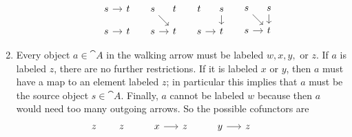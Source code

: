 \documentclass[Book-Poly]{subfiles}
\begin{document}
\begin{exercise}
\begin{solution}
\begin{enumerate}
\[	\quad\;
    \begin{tikzcd}[sep=10pt]
        s\ar[r]&t\\
        s\ar[r]&t
    \end{tikzcd}
	\quad\;
    \begin{tikzcd}[sep=10pt]
        s\ar[dr]&t\\
	s\ar[r]&t
    \end{tikzcd}
        \quad\;
    \begin{tikzcd}[sep=10pt]
        t&s\ar[d]\\
        s\ar[r]&t
    \end{tikzcd}
        \quad\;
    \begin{tikzcd}[sep=10pt]
        s\ar[dr]&s\ar[d]\\
        s\ar[r]&t
    \end{tikzcd}
\]
    \item Every object $a\in\cat{A}$ in the walking arrow must be labeled $w,x,y,$ or $z$.
    If $a$ is labeled $z$, there are no further restrictions.
    If it is labeled $x$ or $y$, then $a$ must have a map to an element labeled $z$; in particular this implies that $a$ must be the source object $s\in\cat{A}$.
    Finally, $a$ cannot be labeled $w$ because then $a$ would need too many outgoing arrows.
    So the possible cofunctors are
\[
    \begin{tikzcd}[sep=15pt]
        z&z
    \end{tikzcd}
	\qquad\;
    \begin{tikzcd}[sep=15pt]
        x\ar[r]&z
    \end{tikzcd}
	\qquad\;
    \begin{tikzcd}[sep=15pt]
        y\ar[r]&z
    \end{tikzcd}
	\qquad\;
\]
\end{enumerate}
\end{solution}
\end{exercise}
\end{document}
